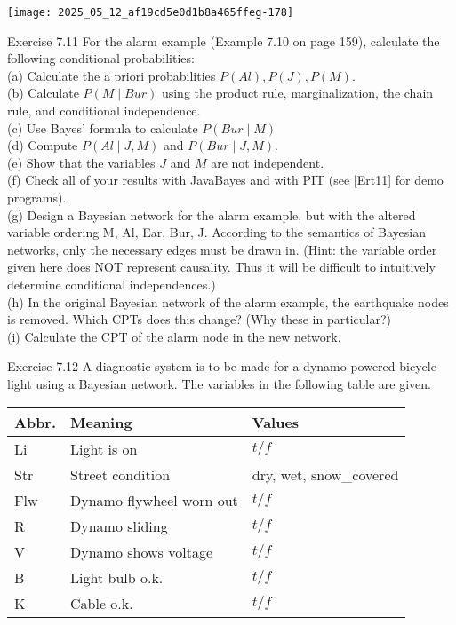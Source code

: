 \documentclass[10pt]{article}
\begin{document}
\begin{center}
\texttt{[image: 2025\_05\_12\_af19cd5e0d1b8a465ffeg-178]}
\end{center}

Exercise 7.11 For the alarm example (Example 7.10 on page 159), calculate the following conditional probabilities:\\
(a) Calculate the a priori probabilities $P(A l), P(J), P(M)$.\\
(b) Calculate $P(M \mid B u r)$ using the product rule, marginalization, the chain rule, and conditional independence.\\
(c) Use Bayes' formula to calculate $P(B u r \mid M)$\\
(d) Compute $P(A l \mid J, M)$ and $P(B u r \mid J, M)$.\\
(e) Show that the variables $J$ and $M$ are not independent.\\[0pt]
(f) Check all of your results with JavaBayes and with PIT (see [Ert11] for demo programs).\\
(g) Design a Bayesian network for the alarm example, but with the altered variable ordering M, Al, Ear, Bur, J. According to the semantics of Bayesian networks, only the necessary edges must be drawn in. (Hint: the variable order given here does NOT represent causality. Thus it will be difficult to intuitively determine conditional independences.)\\
(h) In the original Bayesian network of the alarm example, the earthquake nodes is removed. Which CPTs does this change? (Why these in particular?)\\
(i) Calculate the CPT of the alarm node in the new network.

Exercise 7.12 A diagnostic system is to be made for a dynamo-powered bicycle light using a Bayesian network. The variables in the following table are given.

\begin{center}
\begin{tabular}{|l|l|l|}
\hline
Abbr. & Meaning & Values \\
\hline
Li & Light is on & $t / f$ \\
\hline
Str & Street condition & dry, wet, snow\_covered \\
\hline
Flw & Dynamo flywheel worn out & $t / f$ \\
\hline
R & Dynamo sliding & $t / f$ \\
\hline
V & Dynamo shows voltage & $t / f$ \\
\hline
B & Light bulb o.k. & $t / f$ \\
\hline
K & Cable o.k. & $t / f$ \\
\hline
\end{tabular}
\end{center}
\end{document}
